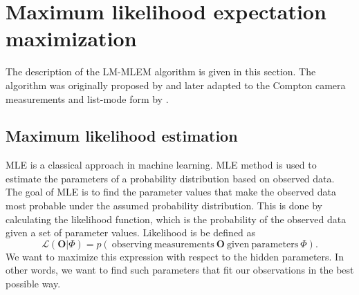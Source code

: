 
\section{Maximum likelihood expectation maximization}
The description of the \ac{LM-MLEM} algorithm is given in this section.
The algorithm was originally proposed by \cite{MLEM_Shepp_1982} and later adapted to the Compton camera measurements and list-mode form by \cite{wilderman}.

\subsection{Maximum likelihood estimation}
\ac{MLE} is a classical approach in machine learning.
\ac{MLE} method is used to estimate the parameters of a probability distribution based on observed data. 
The goal of \ac{MLE} is to find the parameter values that make the observed data most probable under the assumed probability distribution.
This is done by calculating the likelihood function, which is the probability of the observed data given a set of parameter values.
Likelihood is be defined as 
\begin{equation}
  \mathcal{L}(\boldsymbol{O}| \Phi) = p(\ \mathrm{observing\ measurements} \  \boldsymbol{O} \ \mathrm{given\ parameters\ } \Phi ).
  \label{eq:likelihood}
\end{equation}
We want to maximize this expression with respect to the hidden parameters.
In other words, we want to find such parameters that fit our observations in the best possible way.

